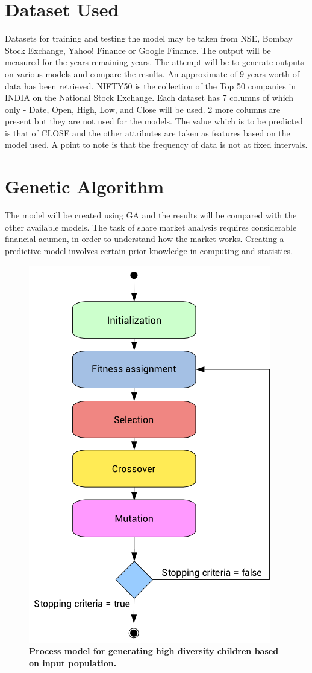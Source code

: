 \documentclass[BTech]{srmuthesis}
\begin{document}
\section{Dataset Used}
Datasets for training and testing the model may be taken from \ac{NSE}, Bombay Stock Exchange, Yahoo! Finance or Google Finance. The output will be measured for the years remaining years. The attempt will be to generate outputs on various models and compare the results. An approximate of 9 years worth of data has been retrieved. \ac{NIFTY50} is the collection of the Top 50 companies in INDIA on the National Stock Exchange. Each dataset has 7 columns of which only - Date, Open, High, Low, and Close will be used. 2 more columns are present but they are not used for the models. The value which is to be predicted is that of CLOSE and the other attributes are taken as features based on the model used. A point to note is that the frequency of data is not at fixed intervals.

\section{Genetic Algorithm}
The model will be created using \ac{GA} and the results will be compared with the other available models. The task of share market analysis requires considerable financial acumen, in order to understand how the market works. Creating a predictive model involves certain prior knowledge in computing and statistics. 

\begin{figure}[H]
	\centering
	\includegraphics[width=0.6\linewidth]{3.png}
	\caption{\bf Process model for generating high diversity children based on input population.}
	\label{fig:GA_Model}
\end{figure}
\end{document}
